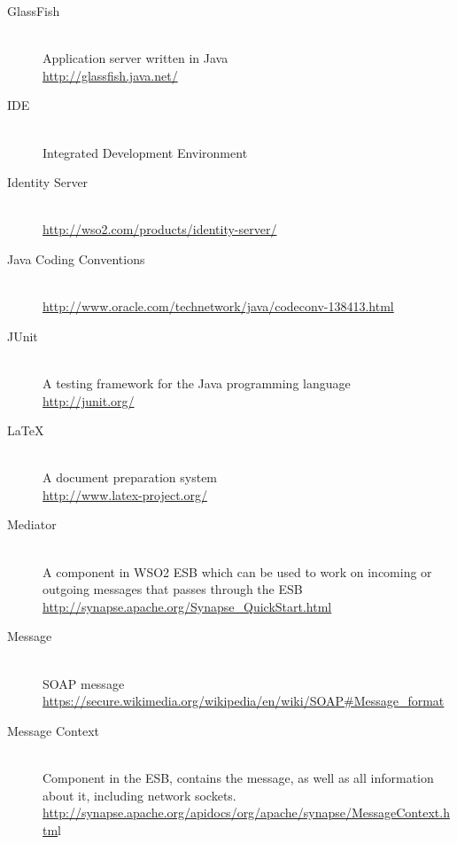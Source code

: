 \begin{description}
\item[GlassFish]\label{glossary:glassfish} \hfill\\
Application server written in Java \\ \url{http://glassfish.java.net/}

\item[IDE]\label{glossary:ide} \hfill\\
Integrated Development Environment

\item[Identity Server]\label{glossary:identity server} \hfill\\
\url{http://wso2.com/products/identity-server/}

\item[Java Coding Conventions]\label{glossary:java coding conventions} \hfill\\
\url{http://www.oracle.com/technetwork/java/codeconv-138413.html}

\item[JUnit]\label{glossary:junit} \hfill\\
A testing framework for the Java programming language \\ \url{http://junit.org/}

\item[LaTeX]\label{glossary:latex} \hfill\\
A document preparation system \\ \url{http://www.latex-project.org/}

\item[Mediator]\label{glossary:mediator} \hfill\\
A component in WSO2 ESB which can be used to work on incoming or outgoing messages that passes through the ESB \\ \url{http://synapse.apache.org/Synapse_QuickStart.html}

\item[Message]\label{glossary:message} \hfill\\
SOAP message  \\ \url{https://secure.wikimedia.org/wikipedia/en/wiki/SOAP#Message_format}

\item[Message Context]\label{glossary:message context} \hfill\\
Component in the ESB, contains the message, as well as all information about it, including network sockets. \\ \url{http://synapse.apache.org/apidocs/org/apache/synapse/MessageContext.htm}l


\end{description}
